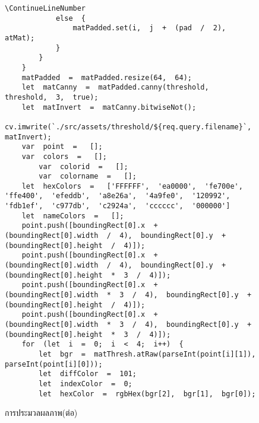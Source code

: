 	\begin{figure}[H]
		{\begin{lstlisting}\ContinueLineNumber
			else  {                        
				matPadded.set(i,  j  +  (pad  /  2),  atMat);                    
			}                
		}            
	}            
	matPadded  =  matPadded.resize(64,  64);            
	let  matCanny  =  matPadded.canny(threshold,  threshold,  3,  true);            
	let  matInvert  =  matCanny.bitwiseNot();            
	cv.imwrite(`./src/assets/threshold/${req.query.filename}`,  matInvert);           
	var  point  =   [];            
	var  colors  =   [];            
		var  colorid  =   [];            
		var  colorname  =   [];            
	let  hexColors  =   ['FFFFFF',  'ea0000',  'fe700e',  'ffe400',  'efeddb',  'a8e26a',  '4a9fe0',  '120992',  'fdb1ef',  'c977db',  'c2924a',  'cccccc',  '000000']            
	let  nameColors  =   [];     
	point.push([boundingRect[0].x  +  (boundingRect[0].width  /  4),  boundingRect[0].y  +  (boundingRect[0].height  /  4)]);            
	point.push([boundingRect[0].x  +  (boundingRect[0].width  /  4),  boundingRect[0].y  +  (boundingRect[0].height  *  3  /  4)]);            
	point.push([boundingRect[0].x  +  (boundingRect[0].width  *  3  /  4),  boundingRect[0].y  +  (boundingRect[0].height  /  4)]);            
	point.push([boundingRect[0].x  +  (boundingRect[0].width  *  3  /  4),  boundingRect[0].y  +  (boundingRect[0].height  *  3  /  4)]);            
	for  (let  i  =  0;  i  <  4;  i++)  {                
		let  bgr  =  matThresh.atRaw(parseInt(point[i][1]),  parseInt(point[i][0]));                
		let  diffColor  =  101;                
		let  indexColor  =  0;                
		let  hexColor  =  rgbHex(bgr[2],  bgr[1],  bgr[0]); 
	 	\end{lstlisting}}
		\caption{การประมวลผลภาพ(ต่อ)}
		\label{Fig:imageProcessing3}
	\end{figure}
